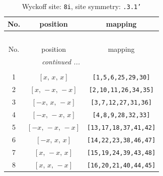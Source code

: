 \documentclass[fleqn,8pt]{jsarticle}
\begin{document}
\begin{longtable}{ccc}
\caption{Wyckoff site: {\tt 8i}, site symmetry: {\tt .3.1'}}
 \\
 \hline \hline
No. & position & mapping \\ \hline \endfirsthead

\multicolumn{2}{l}{\tablename\ \thetable{}} \\
 \hline \hline
No. & position & mapping \\ \hline \endhead

 \hline \hline
\multicolumn{2}{r}{\footnotesize\it continued ...} \\ \endfoot

 \hline \hline
\multicolumn{2}{r}{} \\ \endlastfoot

1 & $\left[ x,\, x,\, x \right]$ & {\tt [1,5,6,25,29,30]} \\ \hline
2 & $\left[ x,\, - x,\, - x \right]$ & {\tt [2,10,11,26,34,35]} \\ \hline
3 & $\left[ - x,\, x,\, - x \right]$ & {\tt [3,7,12,27,31,36]} \\ \hline
4 & $\left[ - x,\, - x,\, x \right]$ & {\tt [4,8,9,28,32,33]} \\ \hline
5 & $\left[ - x,\, - x,\, - x \right]$ & {\tt [13,17,18,37,41,42]} \\ \hline
6 & $\left[ - x,\, x,\, x \right]$ & {\tt [14,22,23,38,46,47]} \\ \hline
7 & $\left[ x,\, - x,\, x \right]$ & {\tt [15,19,24,39,43,48]} \\ \hline
8 & $\left[ x,\, x,\, - x \right]$ & {\tt [16,20,21,40,44,45]} \\
\end{longtable}
\renewcommand{\arraystretch}{1.2}
\end{document}
